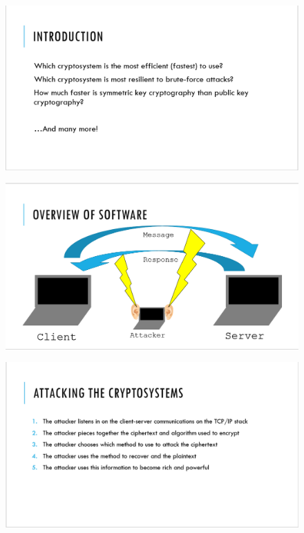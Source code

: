 \documentclass[12pt]{report}
\begin{document}
\begin{figure}[hp!] %
    \begin{center}
        \includegraphics[width=0.85\linewidth]{slide2.PNG}
        \label{fig:slide2}
    \end{center}
\end{figure}

\begin{figure}[hp!] %
    \begin{center}
        \includegraphics[width=0.85\linewidth]{slide3.PNG}
        \label{fig:slide3}
    \end{center}
\end{figure}

\begin{figure}[hp!] %
    \begin{center}
        \includegraphics[width=0.85\linewidth]{slide4.PNG}
        \label{fig:slide4}
    \end{center}
\end{figure}
\end{document}

